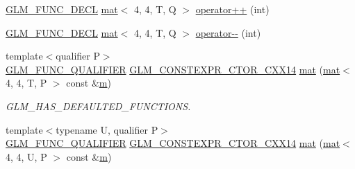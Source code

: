 \begin{DoxyCompactItemize}
\item 
\mbox{\hyperlink{setup_8hpp_ab2d052de21a70539923e9bcbf6e83a51}{G\+L\+M\+\_\+\+F\+U\+N\+C\+\_\+\+D\+E\+CL}} \mbox{\hyperlink{structglm_1_1mat}{mat}}$<$ 4, 4, T, Q $>$ \mbox{\hyperlink{structglm_1_1mat_3_014_00_014_00_01_t_00_01_q_01_4_a63e4b9e5fd2328e10fe75fec5ab1a10b}{operator++}} (int)
\item 
\mbox{\hyperlink{setup_8hpp_ab2d052de21a70539923e9bcbf6e83a51}{G\+L\+M\+\_\+\+F\+U\+N\+C\+\_\+\+D\+E\+CL}} \mbox{\hyperlink{structglm_1_1mat}{mat}}$<$ 4, 4, T, Q $>$ \mbox{\hyperlink{structglm_1_1mat_3_014_00_014_00_01_t_00_01_q_01_4_a3f3b1e563c8dcf771cb1ab9767869232}{operator-\/-\/}} (int)
\item 
{\footnotesize template$<$qualifier P$>$ }\\\mbox{\hyperlink{setup_8hpp_a33fdea6f91c5f834105f7415e2a64407}{G\+L\+M\+\_\+\+F\+U\+N\+C\+\_\+\+Q\+U\+A\+L\+I\+F\+I\+ER}} \mbox{\hyperlink{setup_8hpp_a0900f9145e68bf6061b6f5e7be3fa751}{G\+L\+M\+\_\+\+C\+O\+N\+S\+T\+E\+X\+P\+R\+\_\+\+C\+T\+O\+R\+\_\+\+C\+X\+X14}} \mbox{\hyperlink{structglm_1_1mat_3_014_00_014_00_01_t_00_01_q_01_4_a201642febedfc558e98f60763db82ee4}{mat}} (\mbox{\hyperlink{structglm_1_1mat}{mat}}$<$ 4, 4, T, P $>$ const \&\mbox{\hyperlink{_s_d_l__opengl__glext_8h_af593500c283bf1a787a6f947f503a5c2}{m}})
\begin{DoxyCompactList}\small\item\em G\+L\+M\+\_\+\+H\+A\+S\+\_\+\+D\+E\+F\+A\+U\+L\+T\+E\+D\+\_\+\+F\+U\+N\+C\+T\+I\+O\+NS. \end{DoxyCompactList}\item 
{\footnotesize template$<$typename U, qualifier P$>$ }\\\mbox{\hyperlink{setup_8hpp_a33fdea6f91c5f834105f7415e2a64407}{G\+L\+M\+\_\+\+F\+U\+N\+C\+\_\+\+Q\+U\+A\+L\+I\+F\+I\+ER}} \mbox{\hyperlink{setup_8hpp_a0900f9145e68bf6061b6f5e7be3fa751}{G\+L\+M\+\_\+\+C\+O\+N\+S\+T\+E\+X\+P\+R\+\_\+\+C\+T\+O\+R\+\_\+\+C\+X\+X14}} \mbox{\hyperlink{structglm_1_1mat_3_014_00_014_00_01_t_00_01_q_01_4_ad2beaa9b97c574cef34b46ee73c86501}{mat}} (\mbox{\hyperlink{structglm_1_1mat}{mat}}$<$ 4, 4, U, P $>$ const \&\mbox{\hyperlink{_s_d_l__opengl__glext_8h_af593500c283bf1a787a6f947f503a5c2}{m}})
\item 

\end{DoxyCompactItemize}
